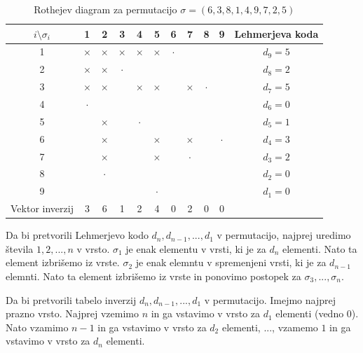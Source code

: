 \documentclass[a4paper, 12pt]{book}
\begin{document}
\begin{table}
    \begin{center}
        \begin{tabular}{ |c|c|c|c|c|c|c|c|c|c|c| } 
        \hline
            $i \setminus \sigma_i$ & 1 & 2 & 3 & 4 & 5 & 6 & 7 & 8 & 9 & Lehmerjeva koda  \\ 
        \hline
            1 & $\times$ & $\times$ & $\times$ & $\times$ & $\times$ & $\cdot$ & & & & $d_9 = 5$  \\ 
        \hline
            2 & $\times$ & $\times$ & $\cdot$ & & & & & & & $d_8 = 2$  \\ 
        \hline
            3 & $\times$ & $\times$ & & $\times$ & $\times$ & & $\times$ & $\cdot$ & & $d_7 = 5$  \\ 
        \hline
            4 & $\cdot$ & & & & & & & & & $d_6 = 0$  \\ 
        \hline
            5 & & $\times$ & & $\cdot$ & & & & & & $d_5 = 1$  \\ 
        \hline
            6 & & $\times$ & & & $\times$ & & $\times$ & & $\cdot$ & $d_4 = 3$  \\ 
        \hline
            7 & & $\times$ & & & $\times$ & & $\cdot$ & & & $d_3 = 2$  \\ 
        \hline
            8 & & $\cdot$ & & & & & & & & $d_2 = 0$  \\ 
        \hline
            9 & & & & & $\cdot$ & & & & & $d_1 = 0$  \\ 
        \hline
            Vektor inverzij & 3 & 6 & 1 & 2 & 4 & 0 & 2 & 0 & 0 &  \\ 
        \hline
        \end{tabular}
    \end{center}
    \caption{ Rothejev diagram za permutacijo $\sigma = (6, 3, 8, 1, 4, 9, 7, 2, 5)$ }
    \label{tbl:rothejev_diagram}
\end{table}

Da bi pretvorili Lehmerjevo kodo $d_n, d_{n-1}, ..., d_1$ v permutacijo, najprej uredimo števila $1, 2, ..., n$ v vrsto. $\sigma_1$ je enak elementu v vrsti, ki je za $d_{n}$ elementi. Nato ta element izbrišemo iz vrste. $\sigma_2$ je enak elemntu v spremenjeni vrsti, ki je za $d_{n-1}$ elemnti. Nato ta element izbrišemo iz vrste in ponovimo postopek za $\sigma_3, ..., \sigma_n$.

Da bi pretvorili tabelo inverzij $d_n, d_{n-1}, ..., d_1$ v permutacijo. Imejmo najprej prazno vrsto. Najprej vzemimo $n$ in ga vstavimo v vrsto za $d_1$ elementi (vedno 0). Nato vzamimo $n-1$ in ga vstavimo v vrsto za $d_{2}$ elementi, ..., vzamemo $1$ in ga vstavimo v vrsto za $d_{n}$ elementi.
\end{document}
